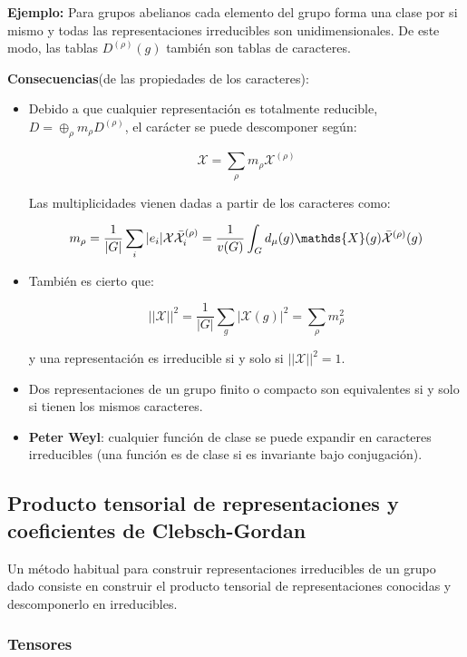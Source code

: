 \smallskip

\textbf{Ejemplo:} Para grupos abelianos cada elemento del grupo forma una clase por si mismo y todas las representaciones irreducibles son unidimensionales. De este modo, las tablas $D^{(\rho)}(g)$ también son tablas de caracteres.
\smallskip

\textbf{Consecuencias}(de las propiedades de los caracteres):

\begin{itemize}
\item Debido a que cualquier representación es totalmente reducible, $D= \oplus _\rho m_\rho D^{(\rho)}$, el carácter se puede descomponer según:

$$\mathcal{X}=\sum _{\rho} m_\rho \mathcal{X}^{(\rho)}$$

Las multiplicidades vienen dadas a partir de los caracteres como:

$$m_\rho =\frac{1}{|G|}\sum _i |e_i|\mathcal{X}\bar{\mathcal{X}}_i^{(\rho)}=\frac{1}{v(G)}\int _G d_\mu (g)\mathds{X}(g)\Bar{\mathcal{X}}^{(\rho)}(g)$$

\item También es cierto que:

$$||\mathcal{X}||^2=\frac{1}{|G|}\sum _g|\mathcal{X}(g)|^2=\sum _\rho m_\rho ^2$$

y una representación es irreducible si y  solo si  $||\mathcal{X}||^2=1$.

\item Dos representaciones de un grupo finito o compacto son equivalentes si y solo si tienen los mismos caracteres.

\item \textbf{Peter Weyl}: cualquier función de clase se puede expandir en caracteres irreducibles (una función es de clase si es invariante bajo conjugación).

\end{itemize}

\subsection{Producto tensorial de representaciones y coeficientes de Clebsch-Gordan}

Un método habitual para construir representaciones irreducibles de un grupo dado consiste en construir el producto tensorial de representaciones conocidas y descomponerlo en irreducibles.

\subsubsection{Tensores}

